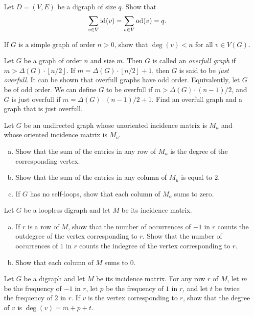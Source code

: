 \begin{problem}
\item Let $D = (V, E)$ be a digraph of size $q$. Show that
  \[
  \sum_{v \in V} \operatorname*{id}(v)
  =
  \sum_{v \in V} \operatorname*{od}(v)
  =
  q.
  \]

\item If $G$ is a simple graph of order $n > 0$, show that
  $\deg(v) < n$ for all $v \in V(G)$.

\item Let $G$ be a graph of order $n$ and size $m$. Then $G$ is called
  an \emph{overfull graph} if
  $m > \Delta(G) \cdot \left\lfloor n / 2 \right\rfloor$. If
  $m = \Delta(G) \cdot \left\lfloor n / 2 \right\rfloor + 1$, then $G$
  is said to be \emph{just overfull}. It can be shown that overfull
  graphs have odd order. Equivalently, let $G$ be of odd order. We can
  define $G$ to be overfull if $m > \Delta(G) \cdot (n-1)/2$,
  and $G$ is just overfull if $m = \Delta(G) \cdot (n-1)/2 + 1$. Find
  an overfull graph and a graph that is just overfull.

\item Let $G$ be an undirected graph whose unoriented incidence matrix
  is $M_u$ and whose oriented incidence matrix is $M_o$.
  \begin{enumerate}[(a)]
  \item Show that the sum of the entries in any row of $M_u$ is the
    degree of the corresponding vertex.

  \item Show that the sum of the entries in any column of $M_u$ is
    equal to $2$.

  \item If $G$ has no self-loops, show that each column of $M_o$ sums
    to zero.
  \end{enumerate}

\item Let $G$ be a loopless digraph and let $M$ be its incidence
  matrix.
  \begin{enumerate}[(a)]
  \item If $r$ is a row of $M$, show that the number of occurrences of
    $-1$ in $r$ counts the outdegree of the vertex corresponding to
    $r$. Show that the number of occurrences of $1$ in $r$ counts the
    indegree of the vertex corresponding to $r$.

  \item Show that each column of $M$ sums to $0$.
  \end{enumerate}

\item Let $G$ be a digraph and let $M$ be its incidence matrix. For
  any row $r$ of $M$, let $m$ be the frequency of $-1$ in $r$, let
  $p$ be the frequency of $1$ in $r$, and let $t$ be twice the
  frequency of $2$ in $r$. If $v$ is the vertex corresponding to
  $r$, show that the degree of $v$ is $\deg(v) = m + p + t$.


\end{problem}
